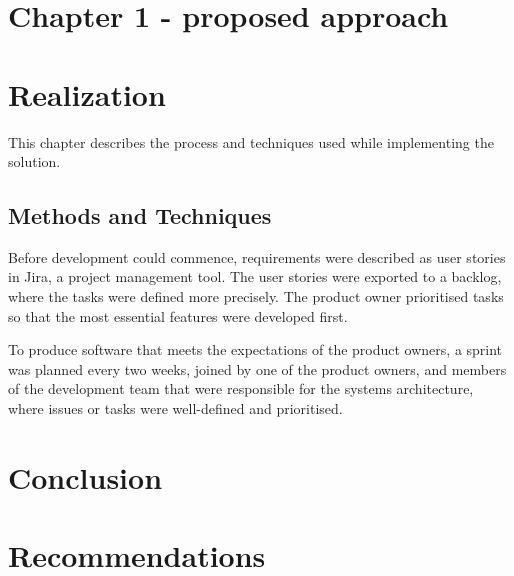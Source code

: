 \documentclass[12pt, letterpaper]{article}
\begin{document}
%
\section{Chapter 1 - proposed approach}

%
\section{Realization}
This chapter describes the process and techniques used while implementing the solution.


\subsection{Methods and Techniques}
Before development could commence, requirements were described as user stories in Jira, a project management tool. The user stories were exported to a backlog, where the tasks were defined more precisely. The product owner prioritised tasks so that the most essential features were developed first.

To produce software that meets the expectations of the product owners, a sprint was planned every two weeks, joined by one of the product owners, and members of the development team that were responsible for the systems architecture, where issues or tasks were well-defined and prioritised.


%
\section{Conclusion}

%
\section{Recommendations}
\end{document}

